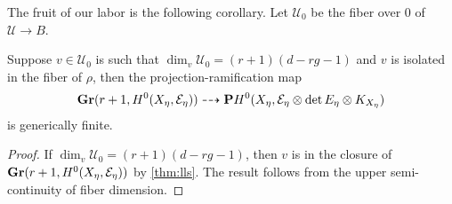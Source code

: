 The fruit of our labor is the following corollary.
Let $\mathcal U_0$ be the fiber over $0$ of $\mathcal U \to B$.
\begin{corollary}\label{prop:degeneration}
  Suppose $v \in \mathcal U_0$ is such that $\dim_v \mathcal U_0 = (r+1)(d-rg-1)$ and $v$ is isolated in the fiber of $\rho$, then the projection-ramification map
  \[{\bf Gr}(r+1, H^0(X_\eta, \mathcal E_\eta)) \dashrightarrow {\bf P} H^0(X_\eta, \mathcal E_\eta \otimes \det E_\eta \otimes K_{X_\eta})\]
  is generically finite.
\end{corollary}
\begin{proof}
  If $\dim_v \mathcal U_0 = (r+1)(d-rg-1)$, then $v$ is in the closure of ${\bf Gr}(r+1, H^0(X_\eta, \mathcal E_\eta))$ by \autoref{thm:lls}.
  The result follows from the upper semi-continuity of fiber dimension.
\end{proof}


